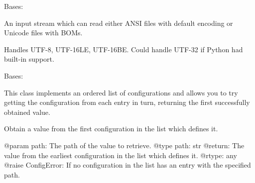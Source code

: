 \documentclass[a4paper,10pt,english]{sphinxmanual}
\begin{document}

\begin{fulllineitems}
\label{commands/apidoc/src:src.pyconf.ConfigInputStream}
Bases: 

An input stream which can read either ANSI files with default encoding
or Unicode files with BOMs.

Handles UTF-8, UTF-16LE, UTF-16BE. Could handle UTF-32 if Python had
built-in support.

\begin{fulllineitems}
\label{commands/apidoc/src:src.pyconf.ConfigInputStream.close}
\end{fulllineitems}


\begin{fulllineitems}
\label{commands/apidoc/src:src.pyconf.ConfigInputStream.read}
\end{fulllineitems}


\begin{fulllineitems}
\label{commands/apidoc/src:src.pyconf.ConfigInputStream.readline}
\end{fulllineitems}


\end{fulllineitems}


\begin{fulllineitems}
\label{commands/apidoc/src:src.pyconf.ConfigList}
Bases: 

This class implements an ordered list of configurations and allows you
to try getting the configuration from each entry in turn, returning
the first successfully obtained value.

\begin{fulllineitems}
\label{commands/apidoc/src:src.pyconf.ConfigList.getByPath}
Obtain a value from the first configuration in the list which defines
it.

@param path: The path of the value to retrieve.
@type path: str
@return: The value from the earliest configuration in the list which
defines it.
@rtype: any
@raise ConfigError: If no configuration in the list has an entry with
the specified path.

\end{fulllineitems}


\end{fulllineitems}
\end{document}
